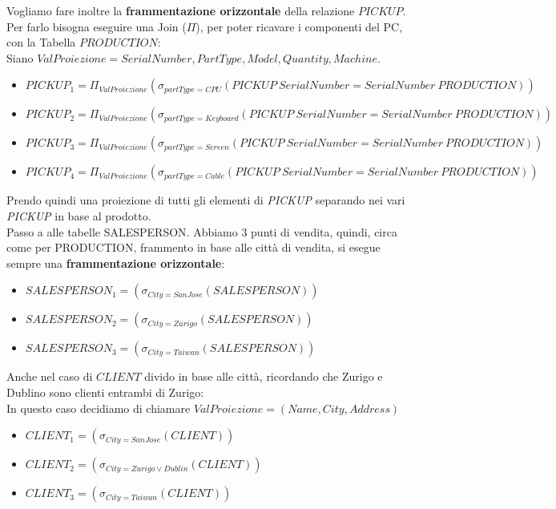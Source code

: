 Vogliamo fare inoltre la \textbf{frammentazione orizzontale} della relazione $PICKUP$. Per farlo bisogna eseguire una Join ($\Pi$), per poter ricavare i componenti del PC, con la Tabella $PRODUCTION$: \\
Siano $ValProiezione = SerialNumber, PartType, Model, Quantity, Machine$.
\begin{center}
    \begin{itemize}
        \item $PICKUP_1 = \Pi_{ValProiezione} ( \sigma_{partType = CPU} (PICKUP \  SerialNumber = SerialNumber \ PRODUCTION) )$
        \item $PICKUP_2 = \Pi_{ValProiezione} ( \sigma_{partType = Keyboard} (PICKUP \  SerialNumber = SerialNumber \ PRODUCTION) )$
        \item $PICKUP_3 = \Pi_{ValProiezione} ( \sigma_{partType = Screen} (PICKUP \  SerialNumber = SerialNumber \ PRODUCTION) )$
        \item $PICKUP_4 = \Pi_{ValProiezione} ( \sigma_{partType = Cable} (PICKUP \  SerialNumber = SerialNumber \ PRODUCTION) )$
    \end{itemize}
\end{center}
Prendo quindi una proiezione di tutti gli elementi di \textit{PICKUP} separando nei vari \textit{PICKUP} in base al prodotto.\\ 
Passo a alle tabelle \textnormal{SALESPERSON}. Abbiamo 3 punti di vendita, quindi, circa come per \textnormal{PRODUCTION}, frammento in base alle città di vendita, si esegue sempre una \textbf{frammentazione orizzontale}:

\begin{itemize}
    \item $SALESPERSON_1 =( \sigma_{City = San Jose} (SALESPERSON) )$
    \item $SALESPERSON_2 =( \sigma_{City = Zurigo} (SALESPERSON) )$
    \item $SALESPERSON_3 =( \sigma_{City = Taiwan} (SALESPERSON) )$
\end{itemize}

Anche nel caso di $CLIENT$ divido in base alle città, ricordando che Zurigo e Dublino sono clienti entrambi di Zurigo:\\
In questo caso decidiamo di chiamare $ValProiezione = (Name, City, Address)$
\begin{itemize}
    \item $CLIENT_1 =( \sigma_{City = San Jose} (CLIENT) )$
    \item $CLIENT_2 =( \sigma_{City = Zurigo \lor Dublin} (CLIENT) )$
    \item $CLIENT_3 =( \sigma_{City = Taiwan} (CLIENT) )$
\end{itemize}

